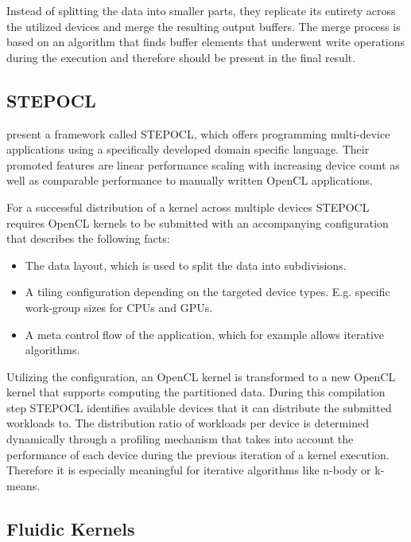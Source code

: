 Instead of splitting the data into smaller parts, they replicate its entirety across the utilized devices and merge the resulting output buffers. The merge process is based on an algorithm that finds buffer elements that underwent write operations during the execution and therefore should be present in the final result.


\subsection*{STEPOCL}

\citeauthor{stepocl} present a framework called STEPOCL, which offers programming multi-device applications using a specifically developed domain specific language\cite{stepocl}. Their promoted features are linear performance scaling with increasing device count as well as comparable performance to manually written OpenCL applications.

For a successful distribution of a kernel across multiple devices STEPOCL requires OpenCL kernels to be submitted with an accompanying configuration that describes the following facts:
\begin{itemize}
    \item The data layout, which is used to split the data into subdivisions.
    \item A tiling configuration depending on the targeted device types. E.g. specific work-group sizes for CPUs and GPUs.
    \item A meta control flow of the application, which for example allows iterative algorithms.
\end{itemize}

Utilizing the configuration, an OpenCL kernel is transformed to a new OpenCL kernel that supports computing the partitioned data. During this compilation step STEPOCL identifies available devices that it can distribute the submitted workloads to. The distribution ratio of workloads per device is determined dynamically through a profiling mechanism that takes into account the performance of each device during the previous iteration of a kernel execution. Therefore it is especially meaningful for iterative algorithms like n-body or k-means.

\subsection*{Fluidic Kernels}

